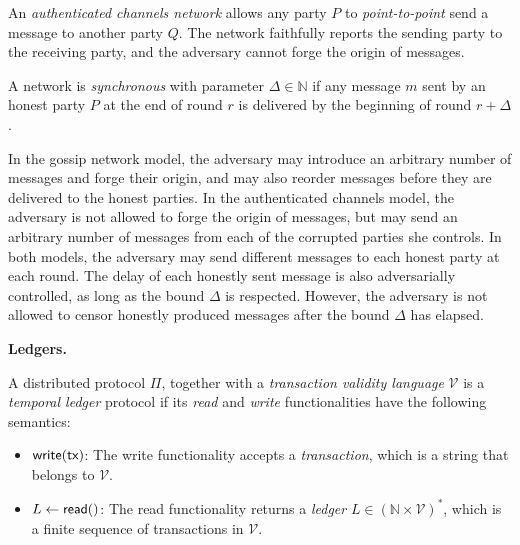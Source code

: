 \begin{definition}
  An \emph{authenticated channels network}
  allows any party $P$ to \emph{point-to-point} send a message to another
  party $Q$. The network faithfully reports the sending party to the receiving
  party, and the adversary cannot forge the origin of messages.
\end{definition}

\begin{definition}[Synchrony]
  A network is \emph{synchronous} with parameter $\Delta \in \mathbb{N}$ if
  any message $m$ sent by an honest party $P$
  at the end of round $r$ is delivered by the beginning of round $r + \Delta$.
\end{definition}

In the gossip network model, the adversary may introduce an arbitrary number of
messages and forge their origin, and may also reorder messages before they are
delivered to the honest parties. In the authenticated channels model, the adversary
is not allowed to forge the origin of messages, but may send an arbitrary number
of messages from each of the corrupted parties she controls.
In both models, the adversary may send different messages
to each honest party at each round. The delay of each honestly sent message is
also adversarially controlled, as long as the bound $\Delta$ is respected.
However, the adversary is not allowed to censor honestly produced messages
after the bound $\Delta$ has elapsed.


\noindent
\textbf{Ledgers.}
\begin{definition}[Ledger]
A distributed protocol $\Pi$, together with a \emph{transaction validity language} $\mathcal{V}$
is a \emph{temporal ledger} protocol if its \emph{read} and \emph{write}
functionalities have the following semantics:

\begin{itemize}
  \item $\textsf{write}(\textsf{tx})$: The write functionality accepts a \emph{transaction}, which is
        a string that belongs to $\mathcal{V}$.
  \item $L \gets \textsf{read}()$: The read functionality returns a \emph{ledger} $L \in (\mathbb{N} \times \mathcal{V})^*$, which is
        a finite sequence of transactions in $\mathcal{V}$.
\end{itemize}
\end{definition}

